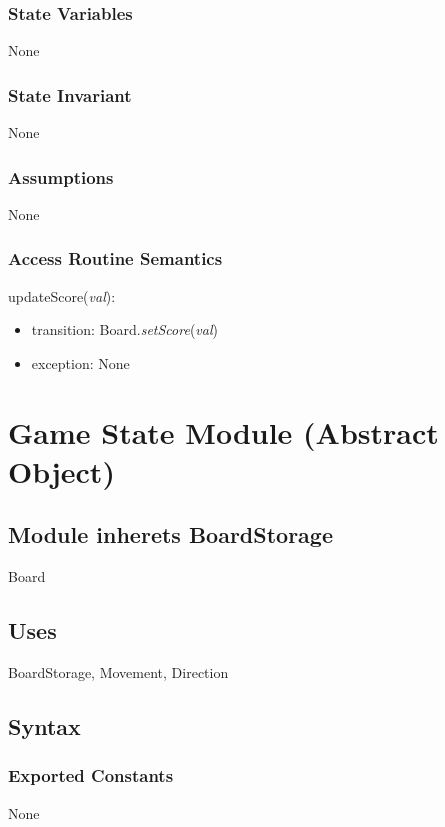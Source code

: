 \documentclass{article}
\begin{document}
		\subsubsection*{State Variables}
			None

		\subsubsection*{State Invariant}
			None

		\subsubsection*{Assumptions}
			None

		\subsubsection*{Access Routine Semantics}

			\noindent updateScore(\textit{val}):
			\begin{itemize}
				\item transition: Board.\textit{setScore}(\textit{val})
				\item exception: None
			\end{itemize}

\newpage

\section*{Game State Module (Abstract Object)}
	
	\subsection*{Module inherets BoardStorage}
		Board

	\subsection*{Uses}
		BoardStorage, Movement, Direction

	\subsection*{Syntax}

		\subsubsection*{Exported Constants}
			None
\end{document}

